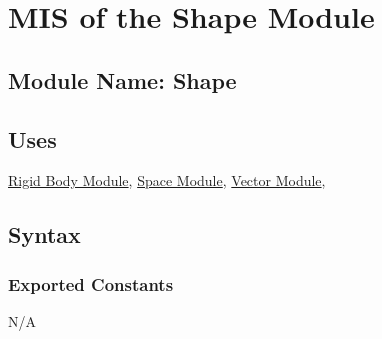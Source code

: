 \documentclass[12pt]{article}
\newcommand{\R}{$\mathbb{R}$}
\newcommand{\UZ}{$\mathbb{Z}^+$}
\newcommand{\Body}{\hyperref[MISBody]{Rigid Body Module}}
\newcommand{\Space}{\hyperref[MISSpace]{Space Module}}
\newcommand{\Vector}{\hyperref[MISVector]{Vector Module}}
\begin{document}

\section{MIS of the Shape Module} \label{MISShape}

\subsection{Module Name: Shape} 

\subsection{Uses} \label{SecUShape}
	 \Body, \Space, \Vector,

\subsection{ Syntax}

\subsubsection{Exported Constants} \label{SecECShape}
N/A	
	
\end{document}
